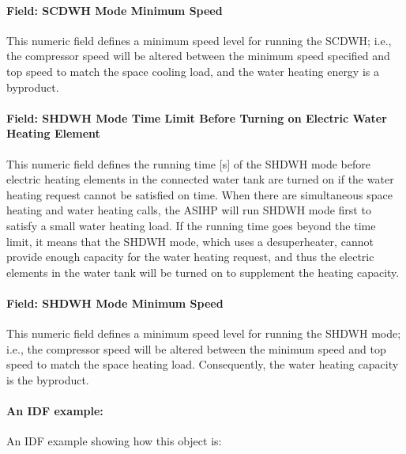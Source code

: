 \paragraph{Field: SCDWH Mode Minimum Speed}\label{Field-SCDWH-MinSped-ASIHP}

This numeric field defines a minimum speed level for running the SCDWH; i.e., the compressor speed will be altered between the minimum speed specified and top speed to match the space cooling load, and the water heating energy is a byproduct.

\paragraph{Field: SHDWH Mode Time Limit Before Turning on Electric Water Heating Element}\label{Field-SHDWH-HeatElemement-ASIHP}

This numeric field defines the running time [s] of the SHDWH mode before electric heating elements in the connected water tank are turned on if the water heating request cannot be satisfied on time. When there are simultaneous space heating and water heating calls, the ASIHP will run SHDWH mode first to satisfy a small water heating load. If the running time goes beyond the time limit, it means that the SHDWH mode, which uses a desuperheater, cannot provide enough capacity for the water heating request, and thus the electric elements in the water tank will be turned on to supplement the heating capacity.

\paragraph{Field: SHDWH Mode Minimum Speed}\label{Field-SHDWH-Mode-Minimum-Speed-ASIHP}

This numeric field defines a minimum speed level for running the SHDWH mode; i.e., the compressor speed will be altered between the minimum speed and top speed to match the space heating load. Consequently, the water heating capacity is the byproduct.



\paragraph{An IDF example:}\label{FieldIDFExample-ASIHP}


An IDF example showing how this object is:


